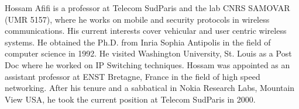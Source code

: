 \documentclass[journal,twoside,final]{IEEEtran}
\begin{document}
\begin{IEEEbiography}{Hossam Afifi}
is a professor at Telecom SudParis and the lab CNRS SAMOVAR (UMR 5157), where he works on mobile and security protocols in wireless communications. His current interests cover vehicular and user centric wireless systems. He obtained the Ph.D. from Inria Sophia Antipolis in the field of computer science in 1992. He visited Washington University, St. Louis as a Post Doc where he worked on IP Switching techniques. Hossam was appointed as an assistant professor at ENST Bretagne, France in the field of high speed networking. After his tenure and a sabbatical in Nokia Research Labs, Mountain View USA, he took the current position at Telecom SudParis in 2000.
\end{IEEEbiography}
\vfill
\end{document}
